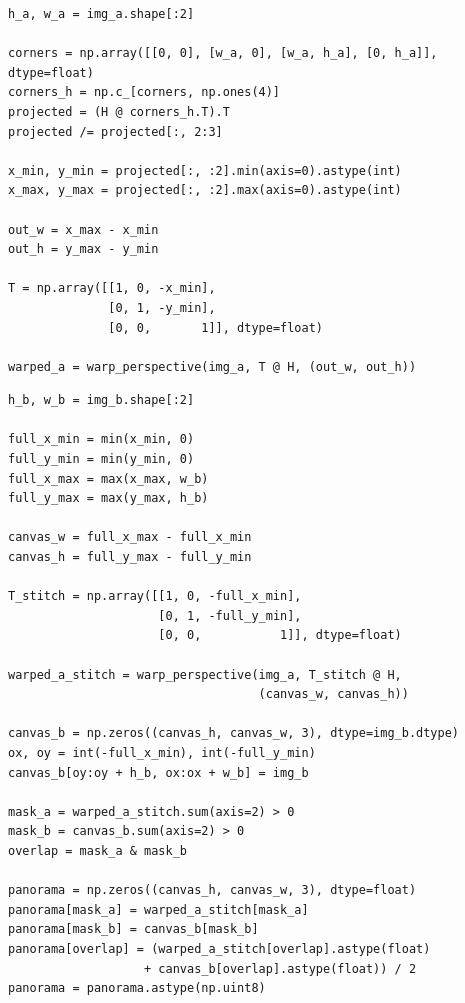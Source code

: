 \documentclass[12pt,a4paper]{article}
\begin{document}
\begin{lstlisting}[caption={Cálculo da bounding box e aplicação do warping.}]
h_a, w_a = img_a.shape[:2]

corners = np.array([[0, 0], [w_a, 0], [w_a, h_a], [0, h_a]], dtype=float)
corners_h = np.c_[corners, np.ones(4)]
projected = (H @ corners_h.T).T
projected /= projected[:, 2:3]

x_min, y_min = projected[:, :2].min(axis=0).astype(int)
x_max, y_max = projected[:, :2].max(axis=0).astype(int)

out_w = x_max - x_min
out_h = y_max - y_min

T = np.array([[1, 0, -x_min],
              [0, 1, -y_min],
              [0, 0,       1]], dtype=float)

warped_a = warp_perspective(img_a, T @ H, (out_w, out_h))
\end{lstlisting}

\begin{lstlisting}[caption={Composição (stitching) com média simples.}]
h_b, w_b = img_b.shape[:2]

full_x_min = min(x_min, 0)
full_y_min = min(y_min, 0)
full_x_max = max(x_max, w_b)
full_y_max = max(y_max, h_b)

canvas_w = full_x_max - full_x_min
canvas_h = full_y_max - full_y_min

T_stitch = np.array([[1, 0, -full_x_min],
                     [0, 1, -full_y_min],
                     [0, 0,           1]], dtype=float)

warped_a_stitch = warp_perspective(img_a, T_stitch @ H,
                                   (canvas_w, canvas_h))

canvas_b = np.zeros((canvas_h, canvas_w, 3), dtype=img_b.dtype)
ox, oy = int(-full_x_min), int(-full_y_min)
canvas_b[oy:oy + h_b, ox:ox + w_b] = img_b

mask_a = warped_a_stitch.sum(axis=2) > 0
mask_b = canvas_b.sum(axis=2) > 0
overlap = mask_a & mask_b

panorama = np.zeros((canvas_h, canvas_w, 3), dtype=float)
panorama[mask_a] = warped_a_stitch[mask_a]
panorama[mask_b] = canvas_b[mask_b]
panorama[overlap] = (warped_a_stitch[overlap].astype(float)
                   + canvas_b[overlap].astype(float)) / 2
panorama = panorama.astype(np.uint8)
\end{lstlisting}
\end{document}
